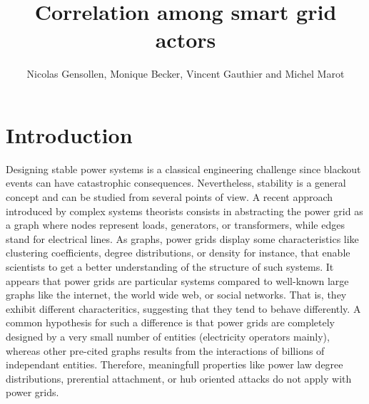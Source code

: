 \documentclass[conference]{IEEEtran}
\begin{document}
%
%
\title{Correlation among smart grid actors}

%
%
\author{Nicolas Gensollen, Monique Becker, Vincent Gauthier and Michel Marot  \\
}

\maketitle

%
%
\begin{abstract}

\end{abstract}

\IEEEpeerreviewmaketitle


%
%
\section{Introduction}
\label{sec:introduction}

Designing stable power systems is a classical engineering challenge since blackout events can have catastrophic consequences. Nevertheless, stability is a general concept and can be studied from several points of view. A recent approach introduced by complex systems theorists consists in abstracting the power grid as a graph where nodes represent loads, generators, or transformers, while edges stand for electrical lines. As graphs, power grids display some characteristics like clustering coefficients, degree distributions, or density for instance, that enable scientists to get a better understanding of the structure of such systems. It appears that power grids are particular systems compared to well-known large graphs like the internet, the world wide web, or social networks. That is, they exhibit different characteritics, suggesting that they tend to behave differently. A common hypothesis for such a difference is that power grids are completely designed by a very small number of entities (electricity operators mainly), whereas other pre-cited graphs results from the interactions of billions of independant entities. Therefore, meaningfull properties like power law degree distributions, prerential attachment, or hub oriented attacks do not apply with power grids.
\end{document}
